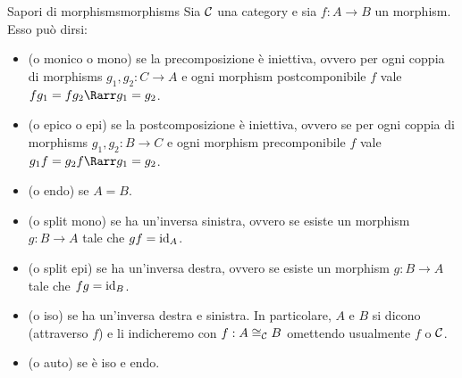 \documentclass{article}
\renewcommand\C{\mc{C}}
\begin{document}
\begin{definition}{Sapori di morphisms}{morphisms}
    Sia $\C$ una category e sia $f: A\to B$ un morphism. Esso può dirsi:\begin{itemize}
        \item {} (o monico o mono) se la precomposizione è iniettiva, ovvero per ogni coppia di morphisms $g_1, g_2 : C\to A$ e ogni morphism postcomponibile $f$ vale $fg_1 = fg_2 \Rarr g_1=g_2$.
        \item {} (o epico o epi) se la postcomposizione è iniettiva, ovvero se per ogni coppia di morphisms $g_1, g_2 : B\to C$ e ogni morphism precomponibile $f$ vale $g_1f = g_2f \Rarr g_1=g_2$.
        \item {} (o endo) se $A=B$.
        \item {} (o split mono) se ha un'inversa sinistra, ovvero se esiste un morphism $g:B\to A$ tale che $gf = \operatorname{id}_A$.
        \item {} (o split epi) se ha un'inversa destra, ovvero se esiste un morphism $g:B\to A$ tale che $fg = \operatorname{id}_B$.
        \item {} (o iso) se ha un'inversa destra e sinistra. In particolare, $A$ e $B$ si dicono  (attraverso $f$) e li indicheremo con $f:A\cong_\C B$ omettendo usualmente $f$ o $\C$.
        \item {} (o auto) se è iso e endo.
    \end{itemize}    
\end{definition}
\end{document}
